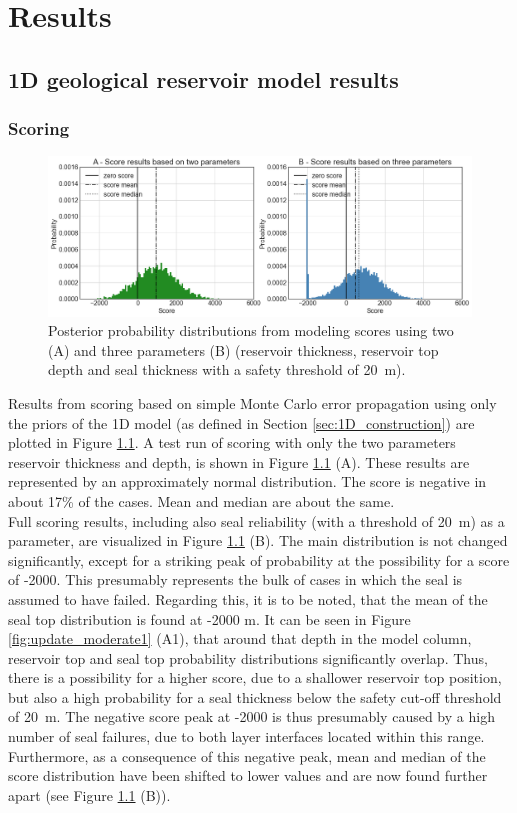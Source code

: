 	\chapter{Results}\label{cha:results}
	
		\section{1D geological reservoir model results}
	
			\subsection{Scoring}
			\begin{figure}[h]
				\centering
				\includegraphics[width=1\textwidth]{Figures/score_results1.png}
				\caption{Posterior probability distributions from modeling scores using two (A) and three parameters (B) (reservoir thickness, reservoir top depth and seal thickness with a safety threshold of 20~m).}\label{fig:score_results1}
			\end{figure}
			Results from scoring based on simple Monte Carlo error propagation using only the priors of the 1D model (as defined in Section \ref{sec:1D_construction}) are plotted in Figure \ref{fig:score_results1}. A test run of scoring with only the two parameters reservoir thickness and depth, is shown in Figure \ref{fig:score_results1} (A). These results are represented by an approximately normal distribution. The score is negative in about 17\% of the cases. Mean and median are about the same.\\	
			Full scoring results, including also seal reliability (with a threshold of 20~m) as a parameter, are visualized in Figure \ref{fig:score_results1} (B). The main distribution is not changed significantly, except for a striking peak of probability at the possibility for a score of -2000. This presumably represents the bulk of cases in which the seal is assumed to have failed. Regarding this, it is to be noted, that the mean of the seal top distribution is found at -2000 m. It can be seen in Figure \ref{fig:update_moderate1} (A1), that around that depth in the model column, reservoir top and seal top probability distributions significantly overlap. Thus, there is a possibility for a higher score, due to a shallower reservoir top position, but also a high probability for a seal thickness below the safety cut-off threshold of 20~m. The negative score peak at -2000 is thus presumably caused by a high number of seal failures, due to both layer interfaces located within this range. Furthermore, as a consequence of this negative peak, mean and median of the score distribution have been shifted to lower values and are now found further apart (see Figure \ref{fig:score_results1} (B)).\\
